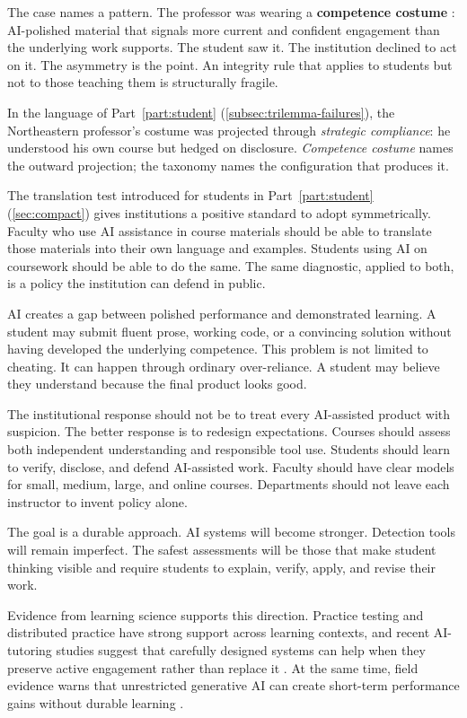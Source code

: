 \documentclass{SIAMbook2023}
\newcommand{\keyterm}[2][\relax]{%
  \textbf{#2}%
  \ifx\relax#1\index{#2|textbf}\else\index{#1|textbf}\fi}
\begin{document}
The case names a pattern. The professor was wearing a \keyterm{competence costume}: AI-polished material that signals more current and confident engagement than the underlying work supports. The student saw it. The institution declined to act on it. The asymmetry is the point. An integrity rule that applies to students but not to those teaching them is structurally fragile.

In the language of Part~\ref{part:student} (\cref{subsec:trilemma-failures}), the Northeastern professor's costume was projected through \emph{strategic compliance}: he understood his own course but hedged on disclosure. \emph{Competence costume} names the outward projection; the taxonomy names the configuration that produces it.

The translation test introduced for students in Part~\ref{part:student} (\cref{sec:compact}) gives institutions a positive standard to adopt symmetrically. Faculty who use AI assistance in course materials should be able to translate those materials into their own language and examples. Students using AI on coursework should be able to do the same. The same diagnostic, applied to both, is a policy the institution can defend in public.

AI creates a gap between polished performance and demonstrated learning. A student may submit fluent prose, working code, or a convincing solution without having developed the underlying competence. This problem is not limited to cheating. It can happen through ordinary over-reliance. A student may believe they understand because the final product looks good.

The institutional response should not be to treat every AI-assisted product with suspicion. The better response is to redesign expectations. Courses should assess both independent understanding and responsible tool use. Students should learn to verify, disclose, and defend AI-assisted work. Faculty should have clear models for small, medium, large, and online courses. Departments should not leave each instructor to invent policy alone.

The goal is a durable approach. AI systems will become stronger. Detection tools will remain imperfect. The safest assessments will be those that make student thinking visible and require students to explain, verify, apply, and revise their work.

Evidence from learning science supports this direction. Practice testing and distributed practice have strong support across learning contexts, and recent AI-tutoring studies suggest that carefully designed systems can help when they preserve active engagement rather than replace it \citep{dunlosky2013improving,kestin2025ai}. At the same time, field evidence warns that unrestricted generative AI can create short-term performance gains without durable learning \citep{bastani2025generative}.
\end{document}
